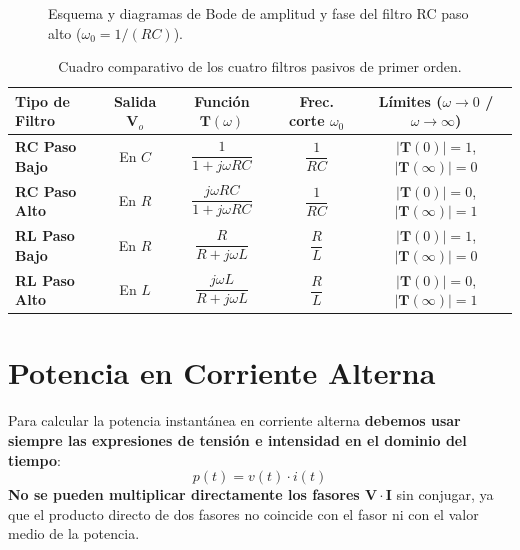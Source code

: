 \begin{figure}[H]
\begin{minipage}{0.33\textwidth}
\end{minipage}
\caption{Esquema y diagramas de Bode de amplitud y fase del filtro RC paso alto ($\omega_0 = 1/(RC)$).}
\end{figure}

\begin{table}[H]
\centering
\renewcommand{\arraystretch}{1.45}
\begin{tabular}{@{}lcccc@{}}
\toprule
\textbf{Tipo de Filtro} & \textbf{Salida $\mathbf{V}_o$} & \textbf{Función $\mathbf{T}(\omega)$} & \textbf{Frec. corte $\omega_0$} & \textbf{Límites ($\omega\to 0$ / $\omega\to\infty$)} \\ \midrule
\textbf{RC Paso Bajo} & En $C$ & $\dfrac{1}{1 + j\omega RC}$ & $\dfrac{1}{RC}$ & $|\mathbf{T}(0)|=1$, $|\mathbf{T}(\infty)|=0$ \\
\textbf{RC Paso Alto} & En $R$ & $\dfrac{j\omega RC}{1 + j\omega RC}$ & $\dfrac{1}{RC}$ & $|\mathbf{T}(0)|=0$, $|\mathbf{T}(\infty)|=1$ \\
\textbf{RL Paso Bajo} & En $R$ & $\dfrac{R}{R + j\omega L}$ & $\dfrac{R}{L}$ & $|\mathbf{T}(0)|=1$, $|\mathbf{T}(\infty)|=0$ \\
\textbf{RL Paso Alto} & En $L$ & $\dfrac{j\omega L}{R + j\omega L}$ & $\dfrac{R}{L}$ & $|\mathbf{T}(0)|=0$, $|\mathbf{T}(\infty)|=1$ \\ \bottomrule
\end{tabular}
\caption{Cuadro comparativo de los cuatro filtros pasivos de primer orden.}
\end{table}

\section{Potencia en Corriente Alterna}

\begin{aviso}
Para calcular la potencia instantánea en corriente alterna \textbf{debemos usar siempre las expresiones de tensión e intensidad en el dominio del tiempo}:
\begin{equation}
    p(t) = v(t) \cdot i(t)
\end{equation}
\textbf{No se pueden multiplicar directamente los fasores $\mathbf{V}\cdot\mathbf{I}$} sin conjugar, ya que el producto directo de dos fasores no coincide con el fasor ni con el valor medio de la potencia.
\end{aviso}

